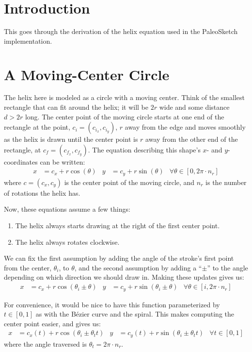 \documentclass{article}
\begin{document}
\section{Introduction}

This goes through the derivation of the helix equation used in the PaleoSketch implementation.

\section{A Moving-Center Circle}

The helix here is modeled as a circle with a moving center.  Think of the smallest rectangle that can fit around the helix; it will be $2r$ wide and some distance $d>2r$ long.  The center point of the moving circle starts at one end of the rectangle at the point, $c_i=(c_{i_x},c_{i_y})$, $r$ away from the edge and moves smoothly as the helix is drawn until the center point is $r$ away from the other end of the rectangle, at $c_f=(c_{f_x},c_{f_y})$.  The equation describing this shape's $x$- and $y$-coordinates can be written:
\begin{align*}
  x &= c_x + r\cos(\theta) & y &= c_y + r\sin(\theta) & \forall\theta\in[0,2\pi\cdot n_r]
\end{align*}
where $c=(c_x,c_y)$ is the center point of the moving circle, and $n_r$ is the number of rotations the helix has.

Now, these equations assume a few things:
\begin{enumerate}
  \item The helix always starts drawing at the right of the first center point.
  \item The helix always rotates clockwise.
\end{enumerate}
We can fix the first assumption by adding the angle of the stroke's first point from the center, $\theta_i$, to $\theta$, and the second assumption by adding a ``$\pm$'' to the angle depending on which direction we should draw in.  Making these updates gives us:
\begin{align*}
  x &= c_x + r\cos(\theta_i\pm\theta) & y &= c_y + r\sin(\theta_i\pm\theta) & \forall\theta\in[i,2\pi\cdot n_r]
\end{align*}

For convenience, it would be nice to have this function parameterized by $t\in[0,1]$ as with the B\'ezier curve and the spiral.  This makes computing the center point easier, and gives us:
\begin{align*}
  x &= c_x(t) + r\cos(\theta_i\pm\theta_t t) & y &= c_y(t) + r\sin(\theta_i\pm\theta_t t) & \forall t\in[0,1]
\end{align*}
where the angle traversed is $\theta_t=2\pi\cdot n_r$.
\end{document}
